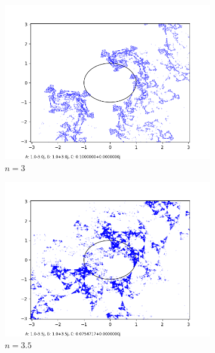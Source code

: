 \documentclass[12pt,a4paper,reqno,parskip=full]{amsart}
\numberwithin{equation}{section}
\theoremstyle{plain}
\theoremstyle{definition}
\begin{document}
\begin{figure}[H]
\begin{subfigure}[b]{0.3\textwidth}
         \includegraphics[width=\textwidth]{images/nn/a-3 b3 h40 d0.025.png}
         \caption{$n=3$}
         \label{fig:n3}
     \end{subfigure}
     \hfill 
     \begin{subfigure}[b]{0.3\textwidth}
         \centering
         \includegraphics[width=\textwidth]{images/nn/a-3.5 b3.5 h30 d0.01.png}
         \caption{$n=3.5$}
         \label{fig:n3.5}
    \end{subfigure}
     \begin{subfigure}[b]{0.3\textwidth}
         \centering

\end{subfigure}
\end{figure}
\end{document}
